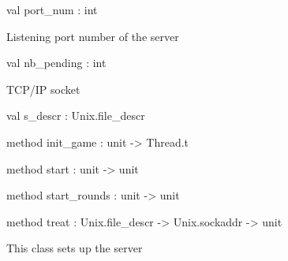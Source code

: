 \documentclass[11pt]{article}
\begin{document}
\begin{ocamldocobjectend}


\label{val:Server.server.port-underscorenum}\begin{ocamldoccode}
val port_num : int
\end{ocamldoccode}
\begin{ocamldocdescription}
Listening port number of the server


\end{ocamldocdescription}


\label{val:Server.server.nb-underscorepending}\begin{ocamldoccode}
val nb_pending : int
\end{ocamldoccode}
\begin{ocamldocdescription}
TCP/IP socket


\end{ocamldocdescription}


\label{val:Server.server.s-underscoredescr}\begin{ocamldoccode}
val s_descr : Unix.file_descr
\end{ocamldoccode}


\label{method:Server.server.init-underscoregame}\begin{ocamldoccode}
method init_game : unit -> Thread.t
\end{ocamldoccode}


\label{method:Server.server.start}\begin{ocamldoccode}
method start : unit -> unit
\end{ocamldoccode}


\label{method:Server.server.start-underscorerounds}\begin{ocamldoccode}
method start_rounds : unit -> unit
\end{ocamldoccode}


\label{method:Server.server.treat}\begin{ocamldoccode}
method treat : Unix.file_descr -> Unix.sockaddr -> unit
\end{ocamldoccode}
\end{ocamldocobjectend}


\begin{ocamldocdescription}
This class sets up the server


\end{ocamldocdescription}
\end{document}
